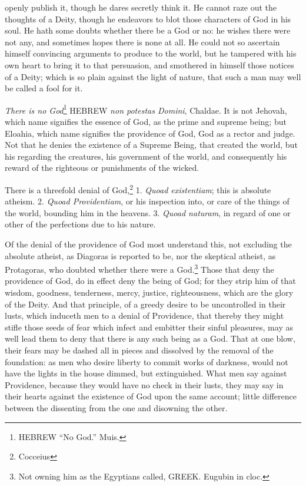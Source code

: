 openly publish it, though he dares secretly think it. He cannot raze
out the thoughts of a Deity, though he endeavors to blot those 
characters of God in his soul. He hath some doubts whether there be a
God or no: he wishes there were not any, and sometimes hopes there
is none at all. He could not so ascertain himself convincing
arguments to produce to the world, but he tampered with his own
heart to bring it to that persuasion, and smothered in himself those
notices of a Deity; which is so plain against the light of nature, that
such a man may well be called a fool for it.

\emph{There is no God}\footnote{HEBREW ``No God.'' Muis.} HEBREW 
\emph{non potestas Domini}, Chaldae. It is
not Jehovah, which name signifies the essence of God, as the prime
and supreme being; but Eloahia, which name signifies the providence
of God, God as a rector and judge. Not that he denies the existence 
of a Supreme Being, that created the world, but his regarding
the creatures, his government of the world, and consequently his
reward of the righteous or punishments of the wicked.

There is a threefold denial of God,\footnote{Cocceius} 1. \emph{Quoad existentiam}; this is
absolute atheism. 2. \emph{Quoad Providentiam}, or his inspection into, or
care of the things of the world, bounding him in the heavens. 3.
\emph{Quoad naturam}, in regard of one or other of the perfections due to
his nature. 

Of the denial of the providence of God most understand this, not
excluding the absolute atheist, as Diagoras is reported to be, nor the
skeptical atheist, as Protagoras, who doubted whether there were a
God.\footnote{Not owning him as the Egyptians called, GREEK. Eugubin in cloc.}
Those that deny the providence of God, do in effect deny the
being of God; for they strip him of that wisdom, goodness, tenderness,
mercy, justice, righteousness, which are the glory of the Deity.
And that principle, of a greedy desire to be uncontrolled in their
lusts, which induceth men to a denial of Providence, that thereby
they might stifle those seeds of fear which infect and embitter
their sinful pleasures, may as well lead them to deny that there
is any such being as a God. That at one blow, their fears may be 
dashed all in pieces and dissolved by the removal of the foundation:
as men who desire liberty to commit works of darkness, would not
have the lights in the house dimmed, but extinguished. What men
say against Providence, because they would have no check in their
lusts, they may say in their hearts against the existence of God upon
the same account; little difference between the dissenting from the
one and disowning the other.

